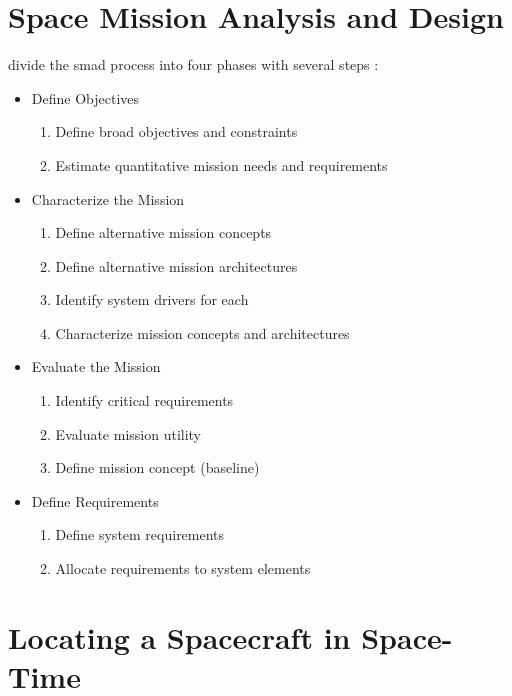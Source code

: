 \section{Space Mission Analysis and Design}
\label{sec:space-mission-analysis-and-design}
\citeauthor{wertz_space_1999} divide the \ac{smad} process into four phases with several steps \autocite[p. 2]{wertz_space_1999}:
\begin{itemize}
    \item Define Objectives
        \begin{enumerate}
            \item Define broad objectives and constraints
            \item Estimate quantitative mission needs and requirements
        \end{enumerate}
    \item Characterize the Mission
        \begin{enumerate}[start=3]
            \item Define alternative mission concepts
            \item Define alternative mission architectures
            \item Identify system drivers for each
            \item Characterize mission concepts and architectures
        \end{enumerate}
    \item Evaluate the Mission
        \begin{enumerate}[start=7]
            \item Identify critical requirements
            \item Evaluate mission utility
            \item Define mission concept (baseline)
        \end{enumerate}
    \item Define Requirements
        \begin{enumerate}[start=10]
            \item Define system requirements
            \item Allocate requirements to system elements
        \end{enumerate}
\end{itemize}

\section{Locating a Spacecraft in Space-Time}
